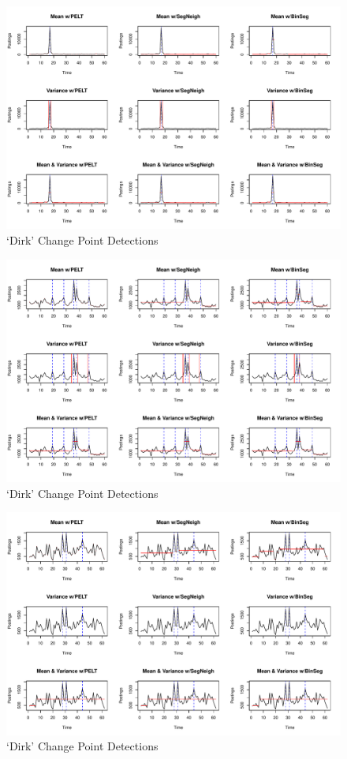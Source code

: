 \documentclass[../main.tex]{subfiles}
\begin{document}
\begin{figure}[h]
    \includegraphics[width=\textwidth]{figures/dirkresults}
    \caption{`Dirk' Change Point Detections}
    \label{fig:dirk}
\end{figure}

\begin{figure}[h]
    \includegraphics[width=\textwidth]{figures/ziggoresults}
    \caption{`Dirk' Change Point Detections}
    \label{fig:ziggo}
\end{figure}


\begin{figure}[h]
    \includegraphics[width=\textwidth]{figures/bolresults}
    \caption{`Dirk' Change Point Detections}
    \label{fig:bol}
\end{figure}
\end{document}
